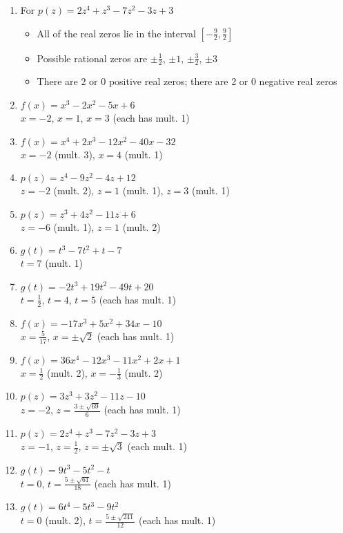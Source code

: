\begin{enumerate}
\item For   $p(z) = 2z^4+z^3-7z^2-3z+3$
\begin{itemize}
\item  All of the real zeros lie in the interval $\left[-\frac{9}{2},\frac{9}{2}\right]$
\item  Possible rational zeros are  $\pm \frac{1}{2}$, $\pm 1$,  $\pm \frac{3}{2}$, $\pm 3$
\item  There are 2 or 0 positive real zeros;  there are 2 or 0 negative real zeros
\end{itemize}


\item $f(x) = x^{3} - 2x^{2} - 5x + 6$ \\ $x = -2$, $x = 1$, $x = 3$ (each has mult. 1)
\item $f(x) = x^{4} + 2x^{3} - 12x^{2} - 40x - 32$ \\ $x = -2$ (mult. 3), $x = 4$ (mult. 1)


\item $p(z) = z^{4} - 9z^{2} - 4z + 12$ \\ $z = -2$ (mult. 2), $z = 1$ (mult. 1), $z = 3$ (mult. 1)
\item $p(z) = z^{3} + 4z^{2} - 11z + 6$ \\ $z = -6$ (mult. 1), $z = 1$ (mult. 2)

\item $g(t) = t^{3} - 7t^{2} + t - 7$ \\ $t = 7$ (mult. 1)
\item $g(t) = -2t^{3} + 19t^{2} - 49t + 20$ \\ $t = \frac{1}{2}$, $t = 4$, $t = 5$ (each has mult. 1)

\item $f(x) = -17x^{3} + 5x^{2} + 34x - 10$ \\ $x = \frac{5}{17}$, $x = \pm \sqrt{2}$ (each has mult. 1)
\item $f(x) = 36x^{4} - 12x^{3} - 11x^{2} + 2x + 1$ \\ $x = \frac{1}{2}$ (mult. 2), $x = -\frac{1}{3}$ (mult. 2)

\item $p(z) = 3z^{3} + 3z^{2} - 11z - 10$ \\ $z = -2$, $z = \frac{3 \pm \sqrt{69}}{6}$ (each has mult. 1)
\item $p(z) = 2z^4+z^3-7z^2-3z+3$ \\ $z = -1$, $z = \frac{1}{2}$, $z=\pm \sqrt{3}$ (each mult. 1)

\item $g(t) = 9t^{3} - 5t^{2} - t$ \\ $t = 0$, $t = \frac{5 \pm \sqrt{61}}{18}$ (each has mult. 1)
\item $g(t) = 6t^{4} - 5t^{3} - 9t^{2}$ \\ $t = 0$ (mult. 2), $t = \frac{5 \pm \sqrt{241}}{12}$ (each has mult. 1)


\end{enumerate}
